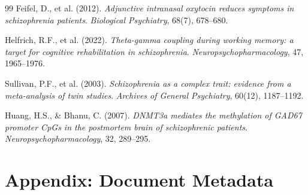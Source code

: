 \documentclass[12pt,a4paper]{article}
\begin{document}
\begin{thebibliography}{99}
Feifel, D., et al. (2012).
\textit{Adjunctive intranasal oxytocin reduces symptoms in
schizophrenia patients}.
\textit{Biological Psychiatry}, 68(7), 678--680.

Helfrich, R.F., et al. (2022).
\textit{Theta-gamma coupling during working memory: a
target for cognitive rehabilitation in schizophrenia}.
\textit{Neuropsychopharmacology}, 47, 1965--1976.

Sullivan, P.F., et al. (2003).
\textit{Schizophrenia as a complex trait: evidence from a
meta-analysis of twin studies}.
\textit{Archives of General Psychiatry}, 60(12), 1187--1192.

Huang, H.S., \& Bhanu, C. (2007).
\textit{DNMT3a mediates the methylation of GAD67 promoter
CpGs in the postmortem brain of schizophrenic patients}.
\textit{Neuropsychopharmacology}, 32, 289--295.

\end{thebibliography}

\newpage
\section*{Appendix: Document Metadata}
\end{document}
